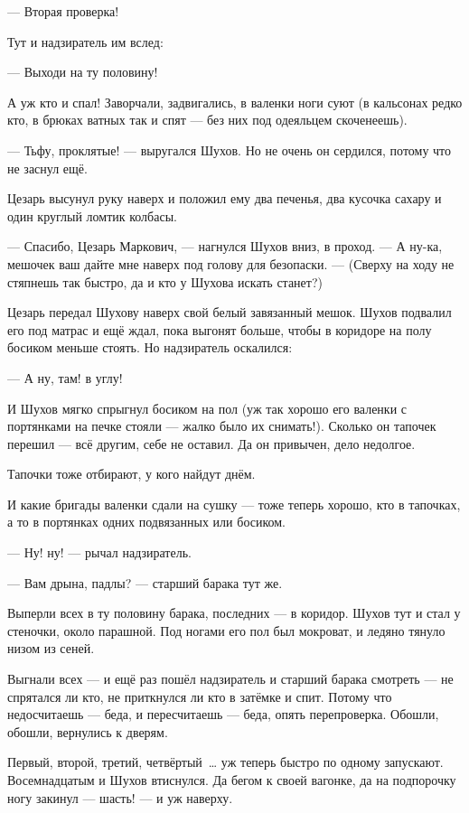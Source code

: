 --- Вторая проверка!

Тут и надзиратель им вслед:

--- Выходи на ту половину!

А уж кто и спал! Заворчали, задвигались, в валенки ноги суют (в кальсонах редко кто, в брюках ватных так и спят --- без них под одеяльцем скоченеешь).

--- Тьфу, проклятые! --- выругался Шухов. Но не очень он сердился, потому что не заснул ещё.

Цезарь высунул руку наверх и положил ему два печенья, два кусочка сахару и один круглый ломтик колбасы.

--- Спасибо, Цезарь Маркович, --- нагнулся Шухов вниз, в проход. --- А ну-ка, мешочек ваш дайте мне наверх под голову для безопаски. --- (Сверху на ходу не стяпнешь так быстро, да и кто у Шухова искать станет?)

Цезарь передал Шухову наверх свой белый завязанный мешок. Шухов подвалил его под матрас и ещё ждал, пока выгонят больше, чтобы в коридоре на полу босиком меньше стоять. Но надзиратель оскалился:

--- А ну, там! в углу!

И Шухов мягко спрыгнул босиком на пол (уж так хорошо его валенки с портянками на печке стояли --- жалко было их снимать!). Сколько он тапочек перешил --- всё другим, себе не оставил. Да он привычен, дело недолгое.

Тапочки тоже отбирают, у кого найдут днём.

И какие бригады валенки сдали на сушку --- тоже теперь хорошо, кто в тапочках, а то в портянках одних подвязанных или босиком.

--- Ну! ну! --- рычал надзиратель.

--- Вам дрына, падлы? --- старший барака тут же.

Выперли всех в ту половину барака, последних --- в коридор. Шухов тут и стал у стеночки, около парашной. Под ногами его пол был мокроват, и ледяно тянуло низом из сеней.

Выгнали всех --- и ещё раз пошёл надзиратель и старший барака смотреть --- не спрятался ли кто, не приткнулся ли кто в затёмке и спит. Потому что недосчитаешь --- беда, и пересчитаешь --- беда, опять перепроверка. Обошли, обошли, вернулись к дверям.

Первый, второй, третий, четвёртый~\dots{} уж теперь быстро по одному запускают. Восемнадцатым и Шухов втиснулся. Да бегом к своей вагонке, да на подпорочку ногу закинул --- шасть! --- и уж наверху.

